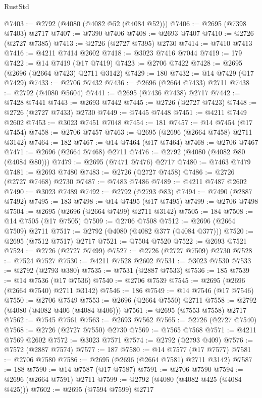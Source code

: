 \begin{lexlean}{RustStd}
\begin{coremodule}
@7403 := @2792 (@4080 (@4082 @52 (@4084 @52)))
@7406 := @2695 (@7398 @7403) @2717
@7407 := @7390 @7406
@7408 := @2693 @7407
@7410 := @2726 (@2727 @7385)
@7413 := @2726 (@2727 @7395) @2730
@7414 := @7410 @7413
@7416 := @4211 @7414 @2602
@7418 := @3023 @7416 @7044
@7419 := 179
@7422 := @14 @7419 (@17 @7419)
@7423 := @2706 @7422
@7428 := @2695 (@2696 (@2664 @7423) @2711 @3142)
@7429 := 180
@7432 := @14 @7429 (@17 @7429)
@7433 := @2706 @7432
@7436 := @2696 (@2664 @7433) @2711
@7438 := @2792 (@4080 @5604)
@7441 := @2695 (@7436 @7438) @2717
@7442 := @7428 @7441
@7443 := @2693 @7442
@7445 := @2726 (@2727 @7423)
@7448 := @2726 (@2727 @7433) @2730
@7449 := @7445 @7448
@7451 := @4211 @7449 @2602
@7453 := @3023 @7451 @7048
@7454 := 181
@7457 := @14 @7454 (@17 @7454)
@7458 := @2706 @7457
@7463 := @2695 (@2696 (@2664 @7458) @2711 @3142)
@7464 := 182
@7467 := @14 @7464 (@17 @7464)
@7468 := @2706 @7467
@7471 := @2696 (@2664 @7468) @2711
@7476 := @2792 (@4080 (@4082 @80 (@4084 @80)))
@7479 := @2695 (@7471 @7476) @2717
@7480 := @7463 @7479
@7481 := @2693 @7480
@7483 := @2726 (@2727 @7458)
@7486 := @2726 (@2727 @7468) @2730
@7487 := @7483 @7486
@7489 := @4211 @7487 @2602
@7490 := @3023 @7489
@7492 := @2792 (@2793 @83)
@7494 := @7490 (@2887 @7492)
@7495 := 183
@7498 := @14 @7495 (@17 @7495)
@7499 := @2706 @7498
@7504 := @2695 (@2696 (@2664 @7499) @2711 @3142)
@7505 := 184
@7508 := @14 @7505 (@17 @7505)
@7509 := @2706 @7508
@7512 := @2696 (@2664 @7509) @2711
@7517 := @2792 (@4080 (@4082 @377 (@4084 @377)))
@7520 := @2695 (@7512 @7517) @2717
@7521 := @7504 @7520
@7522 := @2693 @7521
@7524 := @2726 (@2727 @7499)
@7527 := @2726 (@2727 @7509) @2730
@7528 := @7524 @7527
@7530 := @4211 @7528 @2602
@7531 := @3023 @7530
@7533 := @2792 (@2793 @380)
@7535 := @7531 (@2887 @7533)
@7536 := 185
@7539 := @14 @7536 (@17 @7536)
@7540 := @2706 @7539
@7545 := @2695 (@2696 (@2664 @7540) @2711 @3142)
@7546 := 186
@7549 := @14 @7546 (@17 @7546)
@7550 := @2706 @7549
@7553 := @2696 (@2664 @7550) @2711
@7558 := @2792 (@4080 (@4082 @406 (@4084 @406)))
@7561 := @2695 (@7553 @7558) @2717
@7562 := @7545 @7561
@7563 := @2693 @7562
@7565 := @2726 (@2727 @7540)
@7568 := @2726 (@2727 @7550) @2730
@7569 := @7565 @7568
@7571 := @4211 @7569 @2602
@7572 := @3023 @7571
@7574 := @2792 (@2793 @409)
@7576 := @7572 (@2887 @7574)
@7577 := 187
@7580 := @14 @7577 (@17 @7577)
@7581 := @2706 @7580
@7586 := @2695 (@2696 (@2664 @7581) @2711 @3142)
@7587 := 188
@7590 := @14 @7587 (@17 @7587)
@7591 := @2706 @7590
@7594 := @2696 (@2664 @7591) @2711
@7599 := @2792 (@4080 (@4082 @425 (@4084 @425)))
@7602 := @2695 (@7594 @7599) @2717

\end{coremodule}
\end{lexlean}
